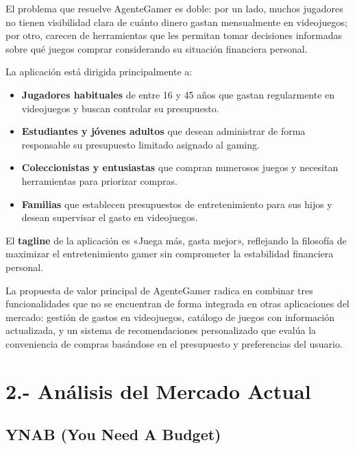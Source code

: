 \documentclass[
  spanish,
  11pt,
  paper=a4,
  ,captions=tableheading
]{scrartcl}
\providecommand{\tightlist}{%
  \setlength{\itemsep}{0pt}\setlength{\parskip}{0pt}}
\begin{document}
El problema que resuelve AgenteGamer es doble: por un lado, muchos
jugadores no tienen visibilidad clara de cuánto dinero gastan
mensualmente en videojuegos; por otro, carecen de herramientas que les
permitan tomar decisiones informadas sobre qué juegos comprar
considerando su situación financiera personal.

La aplicación está dirigida principalmente a:

\begin{itemize}
\tightlist
\item
  \textbf{Jugadores habituales} de entre 16 y 45 años que gastan
  regularmente en videojuegos y buscan controlar su presupuesto.
\item
  \textbf{Estudiantes y jóvenes adultos} que desean administrar de forma
  responsable su presupuesto limitado asignado al gaming.
\item
  \textbf{Coleccionistas y entusiastas} que compran numerosos juegos y
  necesitan herramientas para priorizar compras.
\item
  \textbf{Familias} que establecen presupuestos de entretenimiento para
  sus hijos y desean supervisar el gasto en videojuegos.
\end{itemize}

El \textbf{tagline} de la aplicación es «Juega más, gasta mejor»,
reflejando la filosofía de maximizar el entretenimiento gamer sin
comprometer la estabilidad financiera personal.

La propuesta de valor principal de AgenteGamer radica en combinar tres
funcionalidades que no se encuentran de forma integrada en otras
aplicaciones del mercado: gestión de gastos en videojuegos, catálogo de
juegos con información actualizada, y un sistema de recomendaciones
personalizado que evalúa la conveniencia de compras basándose en el
presupuesto y preferencias del usuario.

\newpage

\hypertarget{anuxe1lisis-del-mercado-actual}{%
\section{2.- Análisis del Mercado
Actual}\label{anuxe1lisis-del-mercado-actual}}

\hypertarget{ynab-you-need-a-budget}{%
\subsection{YNAB (You Need A Budget)}\label{ynab-you-need-a-budget}}
\end{document}

